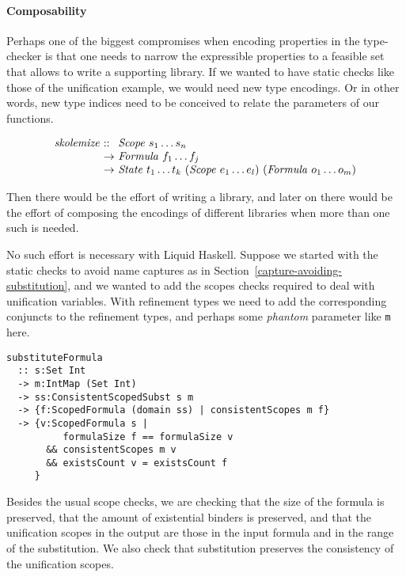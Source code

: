 \documentclass[sigconf]{acmart}
\newcommand{\tc}[1]{{\small\texttt{#1}}}
\begin{document}
\paragraph{Composability} Perhaps one of the biggest compromises when encoding properties in the type-checker
is that one needs to narrow the expressible properties to a feasible set that allows
to write a supporting library. If we wanted to have static checks like those of the
unification example, we would need new type encodings. Or in other words, new type indices
need to be conceived to relate the parameters of our functions.

$$\begin{array}{l@{\ }l@{\ }l}
    \mathit{skolemize} & \mathit{::}  & \mathit{Scope}\ s_1 \ldots s_n \\
                       & \rightarrow  & \mathit{Formula}\ f_1 \ldots f_j \\
                       & \rightarrow  & \mathit{State}\ t_1 \ldots t_k\ (\mathit{Scope}\ e_1 \ldots e_l)\ (\mathit{Formula}\ o_1 \ldots o_m)
\end{array}$$

Then there would be the effort of writing a library, and later on there would be the
effort of composing the encodings of different libraries when more than one such
is needed.

No such effort is necessary with Liquid Haskell. Suppose we started with the static
checks to avoid name captures as in Section~\ref{capture-avoiding-substitution}, and we
wanted to add the scopes checks
required to deal with unification variables. With refinement types we need to add
the corresponding conjuncts to the refinement types, and perhaps some \textit{phantom}
parameter like \tc{m} here.

\begin{verbatim}
substituteFormula
  :: s:Set Int
  -> m:IntMap (Set Int)
  -> ss:ConsistentScopedSubst s m
  -> {f:ScopedFormula (domain ss) | consistentScopes m f}
  -> {v:ScopedFormula s |
          formulaSize f == formulaSize v
       && consistentScopes m v
       && existsCount v = existsCount f
     }
\end{verbatim}
Besides the usual scope checks, we are checking that the size of the formula
is preserved, that the amount of existential binders is preserved, and that
the unification scopes in the output are those in the input formula and in
the range of the substitution. We also check that substitution preserves
the consistency of the unification scopes.
\end{document}
